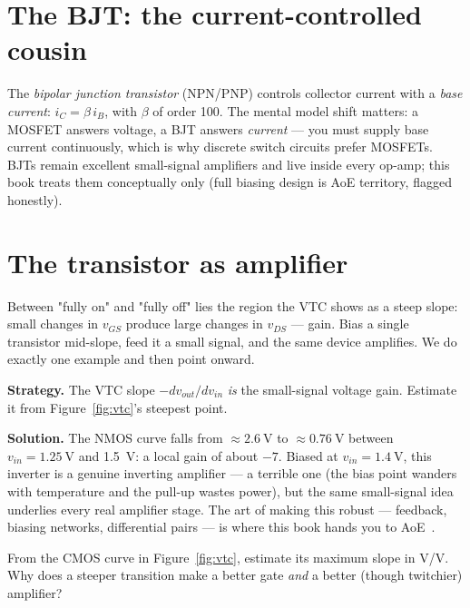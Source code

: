\section{The BJT: the current-controlled cousin}
\label{sec:bjt}

The \emph{bipolar junction transistor} (NPN/PNP) controls
collector current with a \emph{base current}: $i_C = \beta\, i_B$, with
$\beta$ of order 100. The mental model shift matters: a MOSFET answers
voltage, a BJT answers \emph{current} — you must supply base current
continuously, which is why discrete switch circuits prefer MOSFETs. BJTs
remain excellent small-signal amplifiers and live inside every op-amp; this
book treats them conceptually only (full biasing design is AoE territory,
flagged honestly).

\section{The transistor as amplifier}
\label{sec:amplifier}

Between "fully on" and "fully off" lies the region the VTC shows as a steep
slope: small changes in $v_{GS}$ produce large changes in $v_{DS}$ — gain.
Bias a single transistor mid-slope, feed it a small signal, and the same
device amplifies. We do exactly one example and then point onward.

\begin{example}\label{ex:amp}
\textbf{Strategy.} The VTC slope $-dv_{out}/dv_{in}$ \emph{is} the small-signal
voltage gain. Estimate it from Figure~\ref{fig:vtc}'s steepest point.

\textbf{Solution.} The NMOS curve falls from $\approx\qty{2.6}{\volt}$ to
$\approx\qty{0.76}{\volt}$ between $v_{in}=\qty{1.25}{\volt}$ and
\qty{1.5}{\volt}: a local gain of about $-7$. Biased at
$v_{in}=\qty{1.4}{\volt}$, this inverter is a genuine inverting amplifier —
a terrible one (the bias point wanders with temperature and the pull-up
wastes power), but the same small-signal idea underlies every real
amplifier stage. The art of making this robust — feedback, biasing
networks, differential pairs — is where this book hands you to
AoE~\cite{aacvol3}.
\end{example}

\begin{exercise}[easy]
From the CMOS curve in Figure~\ref{fig:vtc}, estimate its maximum slope in
V/V. Why does a steeper transition make a better gate \emph{and} a better
(though twitchier) amplifier?
\end{exercise}

